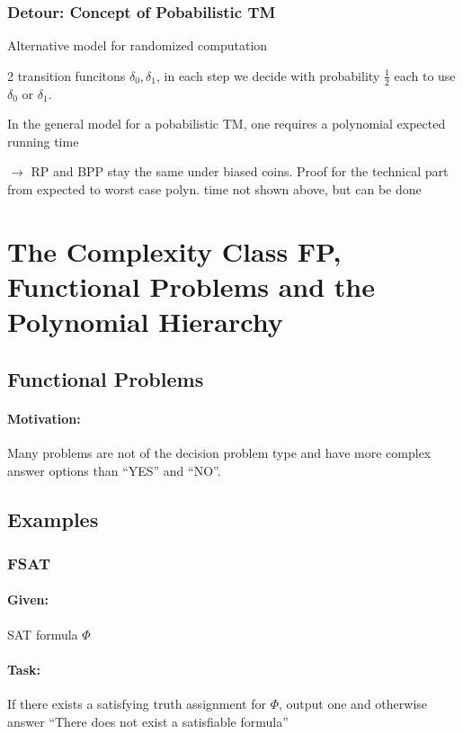 \documentclass[11pt]{article}
\theoremstyle{definition}
\theoremstyle{definition}
\begin{document}
\subsubsection*{Detour: Concept of Pobabilistic TM}
Alternative model for randomized computation

2 transition funcitons $ \delta_0, \delta_1 $, in each step we decide with probability $ \frac{1}{2} $ each to use $ \delta_0 $ or $ \delta_1 $.

In the general model for a pobabilistic TM, one requires a polynomial expected running time

$ \rightarrow $ RP and BPP stay the same under biased coins. Proof for the technical part from expected to worst case polyn. time not shown above, but can be done


\section{The Complexity Class FP, Functional Problems and the Polynomial Hierarchy}

\subsection{Functional Problems}

\paragraph{Motivation: } Many problems are not of the decision problem type and have more complex answer options than ``YES'' and ``NO''.

\subsection{Examples}

\subsubsection{FSAT}
\paragraph{Given:} SAT formula $ \Phi $
\paragraph{Task:} If there exists a satisfying truth assignment for $ \Phi $, output one and otherwise answer ``There does not exist a satisfiable formula''
\end{document}
